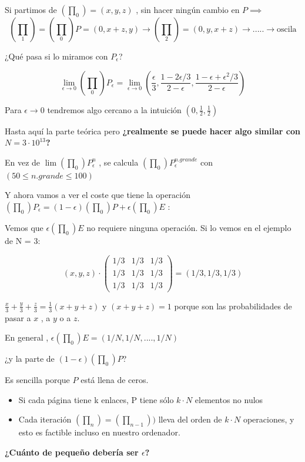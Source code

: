 \begin{example}
Si partimos de $(\prod_0)= (x,y,z)$ , sin hacer ningún cambio en $P \implies$
$$(\prod_1) = (\prod_0)P = (0,x+z,y)\rightarrow (\prod_2) = (0,y,x+z) \rightarrow ..... \rightarrow \text{oscila}$$

¿Qué pasa si lo miramos con $P_{\epsilon}$?

$$\lim\limits_{\epsilon \rightarrow 0} (\prod_0)P_{\epsilon} = \lim\limits_{\epsilon \rightarrow 0}(\frac{\epsilon}{3}, \frac{1- 2\epsilon/3}{2-\epsilon}, \frac{1-\epsilon +  \epsilon^2/3}{2- \epsilon})$$

Para $\epsilon \rightarrow 0$ tendremos algo cercano a la intuición $(0, \frac{1}{2}, \frac{1}{2})$
\end{example}


Hasta aquí la parte teórica pero \textbf{¿realmente se puede hacer algo similar con $N = 3\cdot 10^{13}$?}

En vez de $\lim(\prod_0)P_{\epsilon}^n$ , se calcula $(\prod_0)P_{\epsilon}^{n.grande} $ con $(50 \leq n.grande\leq 100)$

Y ahora vamos a ver el coste que tiene la operación $(\prod_0)P_{\epsilon} = (1-\epsilon)(\prod_0)P + \epsilon(\prod_0)E$ :

Vemos que $\epsilon(\prod_0)E$ no requiere ninguna operación. Si lo vemos en el ejemplo de N = 3:

$$(x , y , z)\cdot \left( \begin{array}{ccc}
1/3 & 1/3 & 1/3 \\
1/3 & 1/3 & 1/3 \\
1/3 & 1/3 & 1/3 \end{array} \right) = (1/3 , 1/3 , 1/3)$$

\obs $\frac{x}{3} + \frac{y}{3} + \frac{z}{3} = \frac{1}{3}(x + y + z)$ y $(x +y +z)=1$ porque son las probabilidades de pasar a $x$ , a $y$ o a $z$.

En general , $\epsilon(\prod_0)E = (1/N , 1/N, ....,1/N)$

¿y la parte de $(1-\epsilon)(\prod_0)P$?

Es sencilla porque $P$ está llena de ceros.
\begin{itemize}
	\item Si cada página tiene k enlaces, P tiene sólo $k\cdot N$ elementos no nulos
	\item Cada iteración $(\prod_n) =(\prod_{n-1}))$ lleva del orden de $k\cdot N$ operaciones, y esto es factible incluso en nuestro ordenador.
\end{itemize}


\textbf{¿Cuánto de pequeño debería ser $\epsilon$?}

